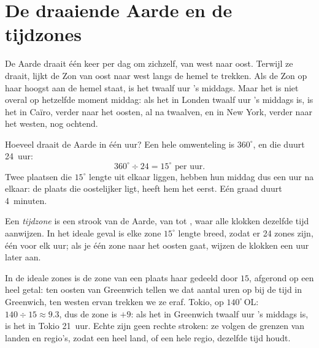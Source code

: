 \section{De draaiende Aarde en de tijdzones}

De Aarde draait één keer per dag om zichzelf, van west naar oost. Terwijl
ze draait, lijkt de Zon van oost naar west langs de hemel te trekken. Als
de Zon op haar hoogst aan de hemel staat, is het twaalf uur 's middags.
Maar het is niet overal op hetzelfde moment middag: als het in Londen
twaalf uur 's middags is, is het in Caïro, verder naar het oosten, al na
twaalven, en in New York, verder naar het westen, nog ochtend.

Hoeveel draait de Aarde in één uur? Een hele omwenteling is $360^\circ$, en
die duurt 24~uur:
\[
360^\circ \div 24 = 15^\circ \text{ per uur.}
\]
Twee plaatsen die $15^\circ$ lengte uit elkaar liggen, hebben hun middag
dus een uur na elkaar: de plaats die oostelijker ligt, heeft hem het eerst.
Eén graad duurt 4~minuten.

\begin{definition}[Tijdzone]\label{def:g6:latitude-longitude:time-zone}
Een \emph{tijdzone} is een strook van de Aarde, van 
tot , waar alle klokken dezelfde tijd aanwijzen. In het ideale geval is
elke zone $15^\circ$ lengte breed, zodat er 24 zones zijn, één voor elk
uur; als je één zone naar het oosten gaat, wijzen de klokken een uur later
aan.
\end{definition}

In de ideale zones is de zone van een plaats haar  gedeeld door
$15$, afgerond op een heel getal: ten oosten van Greenwich tellen we dat
aantal uren op bij de tijd in Greenwich, ten westen ervan trekken we ze
eraf. Tokio, op $140^\circ$\,OL: $140 \div 15 \approx 9.3$, dus de zone is
$+9$: als het in Greenwich twaalf uur 's middags is, is het in Tokio
21~uur. Echte  zijn geen rechte stroken: ze volgen de grenzen van
landen en regio's, zodat een heel land, of een hele regio, dezelfde tijd
houdt.

